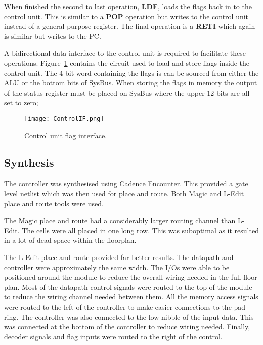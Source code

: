 When finished the second to last operation, \textbf{LDF}, loads the flags back in to the control unit.
This is similar to a \textbf{POP} operation but writes to the control unit instead of a general purpose register. 
The final operation is a \textbf{RETI} which again is similar but writes to the PC.

A bidirectional data interface to the control unit is required to facilitate these operations. 
Figure~\ref{fig:FlagCircuit} contains the circuit used to load and store flags inside the control unit.
The $4$ bit word containing the flags is can be sourced from either the ALU or the bottom bits of SysBus. 
When storing the flags in memory the output of the status register must be placed on SysBus where the upper $12$ bits are all set to zero;  

\begin{figure}[ht]
   \centering
    \texttt{[image: ControlIF.png]}
		\caption{Control unit flag interface.}
		\label{fig:FlagCircuit}
\end{figure}





\subsection{Synthesis}

The controller was synthesised using Cadence Encounter. 
This provided a gate level netlist which was then used for place and route.
Both Magic and L-Edit place and route tools were used. 

The Magic place and route had a considerably larger routing channel than L-Edit.
The cells were all placed in one long row. 
This was suboptimal as it resulted in a lot of dead space within the floorplan.

The L-Edit place and route provided far better results. 
The datapath and controller were approximately the same width. 
The I/Os were able to be positioned around the module to reduce the overall wiring needed in the full floor plan. 
Most of the datapath control signals were routed to the top of the module to reduce the wiring channel needed between them.
All the memory access signals were routed to the left of the controller to make easier connections to the pad ring. 
The controller was also connected to the low nibble of the input data. 
This was connected at the bottom of the controller to reduce wiring needed. 
Finally, decoder signals and flag inputs were routed to the right of the control. 


